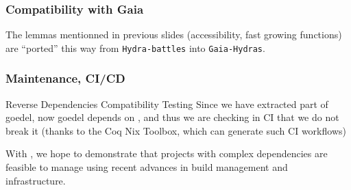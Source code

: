 \documentclass[10pt, fleqn]{beamer}
\begin{document}


\begin{frame}
  \frametitle{Compatibility with Gaia}
  \begin{block}{}
    {\footnotesize
      }
    
  \end{block}
  The lemmas mentionned in previous slides (accessibility, fast growing functions) are ``ported'' this way from \texttt{Hydra-battles}   into \texttt{Gaia-Hydras}.
\end{frame}

\begin{frame}
  \frametitle{Maintenance, CI/CD}
 

  \begin{block}{Reverse Dependencies Compatibility Testing}
    Since we have extracted part of {\color{plugincolor}goedel}, now {\color{plugincolor}goedel} depends on {\color{plugincolor}\Hydras}, and thus we are checking in CI that we do not break it (thanks to the \textcolor{lookcolor}{Coq Nix Toolbox},
    which can generate such CI workflows)
  \end{block}

  \begin{block}{}
    With \Hydras, we hope to demonstrate that projects with complex dependencies are feasible to manage using recent advances in build management and infrastructure.
  \end{block}

\end{frame}

\end{document}
